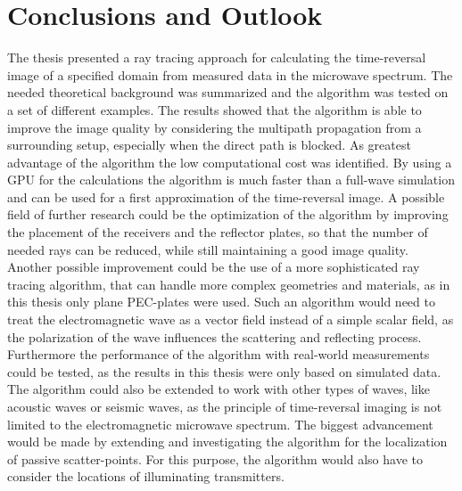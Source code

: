 
\chapter{Conclusions and Outlook}\label{chapter:conclusions}
The thesis presented a ray tracing approach for calculating the time-reversal image of a specified domain from measured data in the microwave spectrum.
The needed theoretical background was summarized and the algorithm was tested on a set of different examples.
The results showed that the algorithm is able to improve the image quality by considering the multipath propagation from a surrounding setup, especially when the direct path is blocked.
As greatest advantage of the algorithm the low computational cost was identified.
By using a GPU for the calculations the algorithm is much faster than a full-wave simulation and can be used for a first approximation of the time-reversal image.
A possible field of further research could be the optimization of the algorithm by improving the placement of the receivers and the reflector plates, so that the number of needed rays can be reduced, while still maintaining a good image quality.
Another possible improvement could be the use of a more sophisticated ray tracing algorithm, that can handle more complex geometries and materials, as in this thesis only plane PEC-plates were used.
Such an algorithm would need to treat the electromagnetic wave as a vector field instead of a simple scalar field, as the polarization of the wave influences the scattering and reflecting process.
Furthermore the performance of the algorithm with real-world measurements could be tested, as the results in this thesis were only based on simulated data.
The algorithm could also be extended to work with other types of waves, like acoustic waves or seismic waves, as the principle of time-reversal imaging is not limited to the electromagnetic microwave spectrum.
The biggest advancement would be made by extending and investigating the algorithm for the localization of passive scatter-points.
For this purpose, the algorithm would also have to consider the locations of illuminating transmitters.



